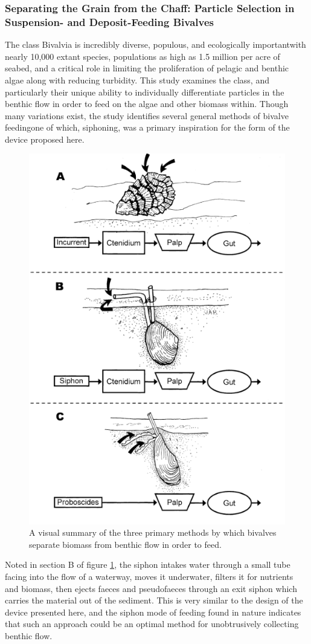 \documentclass[fleqn,10pt]{SelfArx} %
\begin{document}
	\subsubsection*{Separating the Grain from the Chaff: Particle Selection in Suspension- and Deposit-Feeding Bivalves}
	The class Bivalvia is incredibly diverse, populous, and ecologically important\textemdash with nearly 10,000 extant species, populations as high as 1.5 million per acre of seabed, and a critical role in limiting the proliferation of pelagic and benthic algae along with reducing turbidity. This study examines the class, and particularly their unique ability to individually differentiate particles in the benthic flow in order to feed on the algae and other biomass within. Though many variations exist, the study identifies several general methods of bivalve feeding\textemdash one of which, siphoning, was a primary inspiration for the form of the device proposed here. 
	\begin{figure}[h]
		\centering
		\includegraphics[width=0.5\linewidth]{Figures/BivalveInspo.png}
		\caption[Bivalve Filter-Feeding Techniques]{A visual summary of the three primary methods by which bivalves separate biomass from benthic flow in order to feed.}
		\label{fig:SiphonInspo}
	\end{figure}
	Noted in section B of figure \ref{fig:SiphonInspo}, the siphon intakes water through a small tube facing into the flow of a waterway, moves it underwater, filters it for nutrients and biomass, then ejects faeces and pseudofaeces through an exit siphon which carries the material out of the sediment. This is very similar to the design of the device presented here, and the siphon mode of feeding found in nature indicates that such an approach could be an optimal method for unobtrusively collecting benthic flow. 
	
\end{document}

